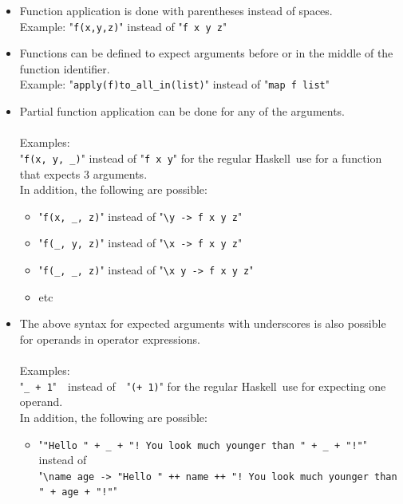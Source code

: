 \documentclass[diploma]{softlab-thesis}
\def\H{Haskell}
\begin{document}
\begin{itemize}

\item
Function application is done with parentheses instead of spaces. \\
Example: "\verb|f(x,y,z)|" instead of "\verb|f x y z|"

\item
Functions can be defined to expect arguments before or in the middle of the
function identifier. \\
Example:
"\verb|apply(f)to_all_in(list)|" instead of "\verb|map f list|"

\item
Partial function application can be done for any of the arguments.
\\\\
Examples:\\
"\verb|f(x, y, _)|" instead of "\verb|f x y|" for the regular \H\ use for
a function that expects 3 arguments.
\\
In addition, the following are possible:

\begin{itemize}

\item
"\verb|f(x, _, z)|" instead of "\verb|\y -> f x y z|"

\item
"\verb|f(_, y, z)|" instead of "\verb|\x -> f x y z|"

\item
"\verb|f(_, _, z)|" instead of "\verb|\x y -> f x y z|"

\item
etc

\end{itemize}

\item
The above syntax for expected arguments with underscores is also possible
for operands in operator expressions.
\\\\
Examples:\\
"\verb|_ + 1|"\ \ instead of\ \  "\verb|(+ 1)|" for the regular \H\ use for expecting
one operand.
\\
In addition, the following are possible:

\begin{itemize}


\item
"\verb|"Hello " + _ + "! You look much younger than " + _ + "!"|"
\\ instead of \\
"\verb|\name age -> "Hello " ++ name ++ "! You look much younger than " + age + "!"|"


\end{itemize}
\end{itemize}
\end{document}
